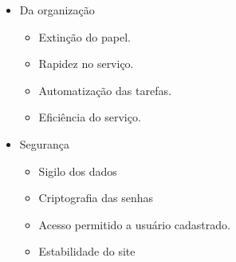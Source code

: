 \begin{itemize}
	 \item Da organização
	   \begin{itemize}
	    \item Extinção do papel.
	    \item Rapidez no serviço.
	    \item Automatização das tarefas.
	    \item Eficiência do serviço.
	   \end{itemize} 
	   
	 \item Segurança
	   \begin{itemize}
	    \item Sigilo dos dados
	    \item Criptografia das senhas
	    \item Acesso permitido a usuário cadastrado.
	    \item Estabilidade do site
	   \end{itemize}
	   
       \end{itemize}
